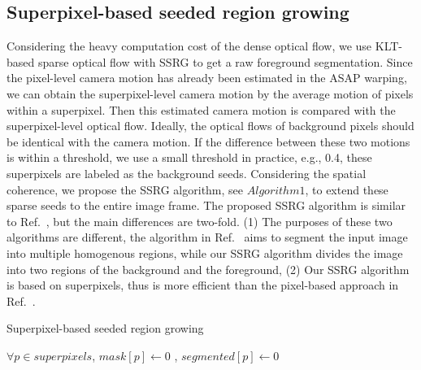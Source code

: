 \subsection{Superpixel-based seeded region growing}
\label{sec:3.2}
Considering the heavy computation cost of the dense optical flow, we use KLT-based sparse optical flow with SSRG to get a raw foreground segmentation. Since the pixel-level camera motion has already been estimated in the ASAP warping, we can obtain the superpixel-level camera motion by the average motion of pixels within a superpixel. Then this estimated camera motion is compared with the superpixel-level optical flow. Ideally, the optical flows of background pixels should be identical with the camera motion. If the difference between these two motions is within a threshold, we use a small threshold in practice, e.g., 0.4, these superpixels are labeled as the background seeds. Considering the spatial coherence, we propose the SSRG algorithm, see $Algorithm 1$, to extend these sparse seeds to the entire image frame. The proposed SSRG algorithm is similar to Ref.~, but the main differences are two-fold. (1) The purposes of these two algorithms are different, the algorithm in Ref.~ aims to segment the input image into multiple homogenous regions, while our SSRG algorithm divides the image into two regions of the background and the foreground, (2) Our SSRG algorithm is based on superpixels, thus is more efficient than the pixel-based approach in Ref.~.

\renewcommand{\algorithmcfname}{算法}
\begin{algorithm}
\caption{Superpixel-based seeded region growing}
\label{ch4:alg:ssrg}
\LinesNumbered
{}
 $\forall p \in superpixels$, $mask[p] \leftarrow 0$ , $segmented[p] \leftarrow 0$ \;

\end{algorithm}

